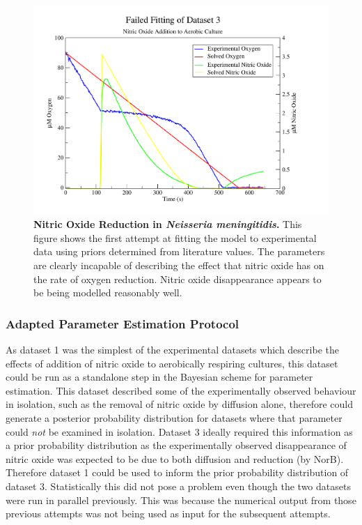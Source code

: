 \begin{figure}[tbp]
 \centering
 \includegraphics[width=15cm, trim=1cm 1cm 3cm 1cm, clip=true]{./06-noreduction/data/aer-no-sim3.pdf}
 \caption[{Nitric Oxide Reduction in \textit{Neisseria meningitidis}.}]{{\bf Nitric Oxide Reduction in \textit{Neisseria meningitidis}.} This figure shows the first attempt at fitting the model to experimental data using priors determined from literature values. The parameters are clearly incapable of describing the effect that nitric oxide has on the rate of oxygen reduction. Nitric oxide disappearance appears to be being modelled reasonably well.}
 \label{fig:nosim3.1}
\end{figure}

\subsubsection{Adapted Parameter Estimation Protocol}

As dataset 1 was the simplest of the experimental datasets which describe the effects of addition of nitric oxide to aerobically respiring cultures, this dataset could be run as a standalone step in the Bayesian scheme for parameter estimation. This dataset described some of the experimentally observed behaviour in isolation, such as the removal of nitric oxide by diffusion alone, therefore could generate a posterior probability distribution for datasets where that parameter could \textit{not} be examined in isolation. Dataset 3 ideally required this information as a prior probability distribution as the experimentally observed disappearance of nitric oxide was expected to be due to both diffusion and reduction (by NorB). Therefore dataset 1 could be used to inform the prior probability distribution of dataset 3. Statistically this did not pose a problem even though the two datasets were run in parallel previously. This was because the numerical output from those previous attempts was not being used as input for the subsequent attempts.

